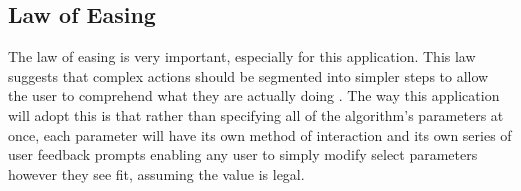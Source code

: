 \subsection{Law of Easing}

The law of easing is very important, especially for this application. This law suggests that complex actions should be segmented into simpler steps to allow the user to comprehend what they are actually doing \cite{99designs:laws}. The way this application will adopt this is that rather than specifying all of the algorithm’s parameters at once, each parameter will have its own method of interaction and its own series of user feedback prompts enabling any user to simply modify select parameters however they see fit, assuming the value is legal.

